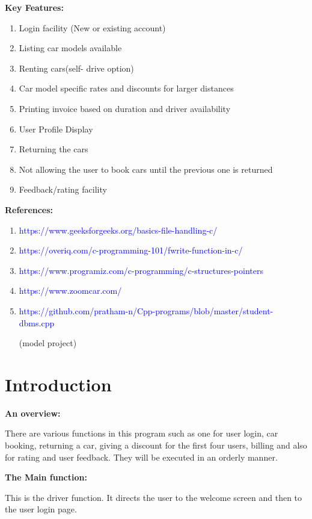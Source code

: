 \documentclass[12pt]{article}
\begin{document}
\noindent
\textbf{Key Features:}
\begin{enumerate}
    \item Login facility (New or existing account)
    \item Listing car models available
    \item Renting cars(self- drive option)
    \item Car model specific rates and discounts for larger distances
    \item Printing invoice based on duration and driver availability
    \item User Profile Display
    \item Returning the cars
    \item Not allowing the user to book cars until the previous one is returned
    \item Feedback/rating facility
\end{enumerate}

\noindent
\para
\textbf{References:}
\begin{enumerate}
    \item \textcolor{blue}{https://www.geeksforgeeks.org/basics-file-handling-c/}
    \item \textcolor{blue}{https://overiq.com/c-programming-101/fwrite-function-in-c/}
    \item \textcolor{blue}{https://www.programiz.com/c-programming/c-structures-pointers}
    \item \textcolor{blue}{https://www.zoomcar.com/}
    \item \textcolor{blue}{https://github.com/pratham-n/Cpp-programs/blob/master/student-dbms.cpp}
    
    (model project) 
\end{enumerate}



\newpage                %
\section{Introduction}  %
\textbf{An overview:}
\par There are various functions in this program such as one for user login, car booking, returning a car, giving a discount for the first four users, billing and also for rating and user feedback. They will be executed in an orderly manner.

\noindent
\textbf{The Main function:}
\par This is the driver function. It directs the user to the welcome screen and then to the user login page.
\end{document}
